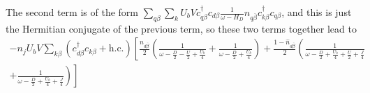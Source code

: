 \documentclass[reprint,superscriptaddress,floatfix]{revtex4-2}
\begin{document}
\begin{widetext}
The second term is of the form \(\sum_{q\beta}\sum_{k}U_b V c^\dagger_{q\beta}c_{d\beta} \frac{1}{\omega - H_D} \hat n_{q\overline\beta} c^\dagger_{k\beta}c_{q\beta}\),
and this is just the Hermitian conjugate of the previous term, so these two terms together lead to
\begin{equation}\begin{aligned}
	-n_jU_b V\sum_{k\beta} \left(c^\dagger_{d\beta} c_{k\beta} + \text{h.c.}\right)\left[\frac{\hat n_{d\overline\beta}}{2}\left(\frac{1}{\omega - \frac{D}{2} - \frac{U}{2} + \frac{U_b}{4}} + \frac{1}{\omega - \frac{D}{2} + \frac{U_b}{4}}\right) + \frac{1-\hat n_{d\overline\beta}}{2}\left(\frac{1}{\omega - \frac{D}{2} + \frac{U_b}{4} + \frac{U}{2} + \frac{J}{4}} \right.\right.\\
	+\left.\left. \frac{1}{\omega - \frac{D}{2} + \frac{U_b}{4} + \frac{J}{4}}\right)\right]
\end{aligned}\end{equation}


\end{widetext}
\end{document}
